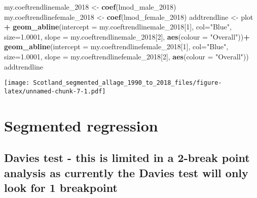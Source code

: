 \documentclass[]{article}
\newenvironment{Shaded}{\begin{snugshade}}{\end{snugshade}}
\newcommand{\KeywordTok}[1]{\textcolor[rgb]{0.13,0.29,0.53}{\textbf{#1}}}
\newcommand{\DataTypeTok}[1]{\textcolor[rgb]{0.13,0.29,0.53}{#1}}
\newcommand{\DecValTok}[1]{\textcolor[rgb]{0.00,0.00,0.81}{#1}}
\newcommand{\FloatTok}[1]{\textcolor[rgb]{0.00,0.00,0.81}{#1}}
\newcommand{\StringTok}[1]{\textcolor[rgb]{0.31,0.60,0.02}{#1}}
\newcommand{\OperatorTok}[1]{\textcolor[rgb]{0.81,0.36,0.00}{\textbf{#1}}}
\newcommand{\NormalTok}[1]{#1}
\begin{document}
\begin{Shaded}
\begin{Highlighting}[]
\NormalTok{my.coeftrendlinemale_}\DecValTok{2018}\NormalTok{ <-}\StringTok{ }\KeywordTok{coef}\NormalTok{(lmod_male_}\DecValTok{2018}\NormalTok{)}
\NormalTok{my.coeftrendlinefemale_}\DecValTok{2018}\NormalTok{ <-}\StringTok{ }\KeywordTok{coef}\NormalTok{(lmod_female_}\DecValTok{2018}\NormalTok{)}
\NormalTok{addtrendline <-}\StringTok{ }\NormalTok{plot }\OperatorTok{+}\StringTok{ }\KeywordTok{geom_abline}\NormalTok{(}\DataTypeTok{intercept =}\NormalTok{ my.coeftrendlinemale_}\DecValTok{2018}\NormalTok{[}\DecValTok{1}\NormalTok{], }\DataTypeTok{col=}\StringTok{"Blue"}\NormalTok{, }\DataTypeTok{size=}\FloatTok{1.0001}\NormalTok{,}
                                       \DataTypeTok{slope =}\NormalTok{ my.coeftrendlinemale_}\DecValTok{2018}\NormalTok{[}\DecValTok{2}\NormalTok{], }
                                       \KeywordTok{aes}\NormalTok{(}\DataTypeTok{colour =} \StringTok{"Overall"}\NormalTok{))}\OperatorTok{+}
\StringTok{  }\KeywordTok{geom_abline}\NormalTok{(}\DataTypeTok{intercept =}\NormalTok{ my.coeftrendlinefemale_}\DecValTok{2018}\NormalTok{[}\DecValTok{1}\NormalTok{], }\DataTypeTok{col=}\StringTok{"Blue"}\NormalTok{, }\DataTypeTok{size=}\FloatTok{1.0001}\NormalTok{,}
                                       \DataTypeTok{slope =}\NormalTok{ my.coeftrendlinefemale_}\DecValTok{2018}\NormalTok{[}\DecValTok{2}\NormalTok{], }
                                       \KeywordTok{aes}\NormalTok{(}\DataTypeTok{colour =} \StringTok{"Overall"}\NormalTok{))}
\NormalTok{addtrendline}
\end{Highlighting}
\end{Shaded}

\texttt{[image: Scotland\_segmented\_allage\_1990\_to\_2018\_files/figure-latex/unnamed-chunk-7-1.pdf]}

\section{Segmented regression}\label{segmented-regression}

\subsection{Davies test - this is limited in a 2-break point analysis as
currently the Davies test will only look for 1
breakpoint}\label{davies-test---this-is-limited-in-a-2-break-point-analysis-as-currently-the-davies-test-will-only-look-for-1-breakpoint}
\end{document}
